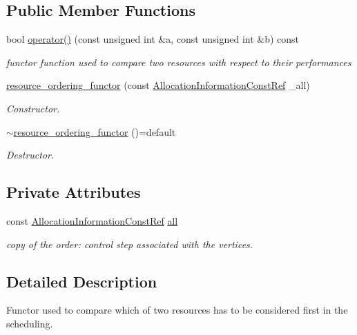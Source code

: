 \subsection*{Public Member Functions}
\begin{DoxyCompactItemize}
\item 
bool \hyperlink{structresource__ordering__functor_a2a3ad6ccd7fc19d0b26caacb0d78991f}{operator()} (const unsigned int \&a, const unsigned int \&b) const
\begin{DoxyCompactList}\small\item\em functor function used to compare two resources with respect to their performances \end{DoxyCompactList}\item 
\hyperlink{structresource__ordering__functor_a11e4032747587f1e6159b73e8085f681}{resource\+\_\+ordering\+\_\+functor} (const \hyperlink{allocation__information_8hpp_a54287618a63bf87e31ddb17ba01e7ca7}{Allocation\+Information\+Const\+Ref} \+\_\+all)
\begin{DoxyCompactList}\small\item\em Constructor. \end{DoxyCompactList}\item 
\hyperlink{structresource__ordering__functor_a9f09460a6ba427158d39dcf5e75da547}{$\sim$resource\+\_\+ordering\+\_\+functor} ()=default
\begin{DoxyCompactList}\small\item\em Destructor. \end{DoxyCompactList}\end{DoxyCompactItemize}
\subsection*{Private Attributes}
\begin{DoxyCompactItemize}
\item 
const \hyperlink{allocation__information_8hpp_a54287618a63bf87e31ddb17ba01e7ca7}{Allocation\+Information\+Const\+Ref} \hyperlink{structresource__ordering__functor_a1e053666eb3ddc25fe3bfb68b35296b1}{all}
\begin{DoxyCompactList}\small\item\em copy of the order\+: control step associated with the vertices. \end{DoxyCompactList}\end{DoxyCompactItemize}


\subsection{Detailed Description}
Functor used to compare which of two resources has to be considered first in the scheduling. 

